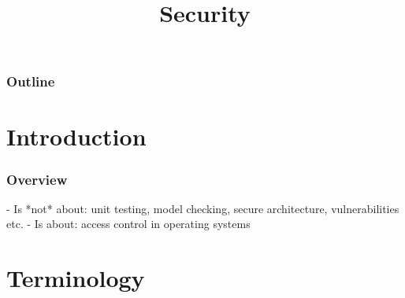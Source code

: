 %
%
%
%
%
%

%
%

%
%

\def\path{../../../..}

%
%



%
%

\title{Security}

%
%



%
%

\begin{frame}
  \titlepage
\end{frame}

%
%

\begin{frame}
  \frametitle{Outline}

  \tableofcontents
\end{frame}

%
%

%
%

\section{Introduction}


\begin{frame}
  \frametitle{Overview}

  - Is *not* about: unit testing, model checking, secure architecture, vulnerabilities etc.
  - Is about: access control in operating systems
\end{frame}

%
%

\section{Terminology}



